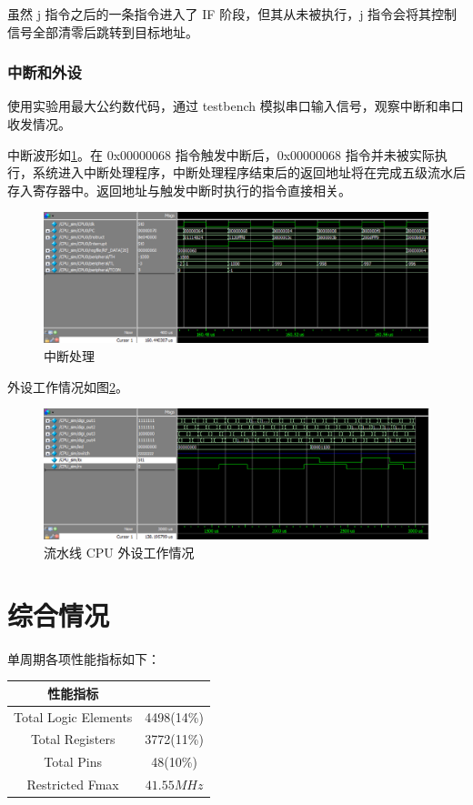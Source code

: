 \documentclass{ctexart}
\begin{document}
	虽然 j 指令之后的一条指令进入了 IF 阶段，但其从未被执行，j 指令会将其控制信号全部清零后跳转到目标地址。

	\subsubsection{中断和外设}

	使用实验用最大公约数代码，通过 testbench 模拟串口输入信号，观察中断和串口收发情况。

	中断波形如\ref{simpicture12}。在 0x00000068 指令触发中断后，0x00000068 指令并未被实际执行，系统进入中断处理程序，中断处理程序结束后的返回地址将在完成五级流水后存入寄存器中。返回地址与触发中断时执行的指令直接相关。

	\begin{figure}[ht]
		\centering
		\includegraphics[width = \textwidth]{PipelineTestWave5.eps}
		\caption{中断处理}
		\label{simpicture12}
	\end{figure}

	外设工作情况如图\ref{simpicture13}。

	\begin{figure}[ht]
		\centering
		\includegraphics[width = \textwidth]{PipelineTestWave6.eps}
		\caption{流水线 CPU 外设工作情况}
		\label{simpicture13}
	\end{figure}	

	\section{综合情况}
	单周期各项性能指标如下：
	\begin{center}
		\begin{tabular}{|c|c|}
		\hline
		性能指标 & \\
		\hline
		Total Logic Elements & 4498(14\%) \\
		Total Registers & 3772(11\%) \\
		Total Pins & 48(10\%) \\
		Restricted Fmax & $41.55 MHz$ \\  
		\hline
		\end{tabular}
	\end{center}
	
\end{document}
